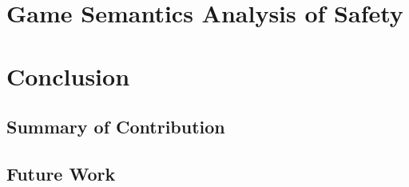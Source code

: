     


\chapter{Game Semantics Analysis of Safety}

    



\chapter{Conclusion}
    \section{Summary of Contribution}
    \section{Future Work}



    
    

         {\protect{}}
